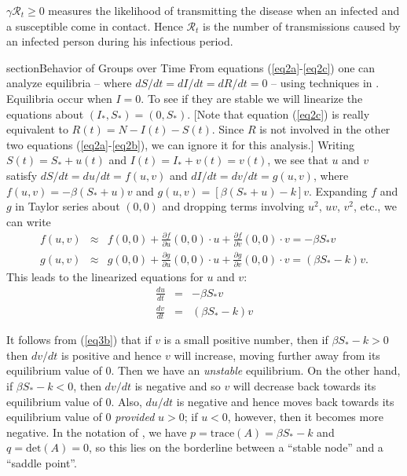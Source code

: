 \documentclass[11pt]{article}
\begin{document}
$\gamma \mathcal{R}_t \geq 0$ measures the likelihood
of transmitting the disease when an infected and a susceptible come
in contact.   Hence $\mathcal{R}_t$ is the number of transmissions
caused by an infected person during his infectious period.

section{Behavior of Groups over Time}
From equations (\ref{eq2a}-\ref{eq2c}) one can analyze equilibria -- where $dS/dt = 
dI/dt = dR/dt = 0$ -- using techniques in \cite[Sec. 9.2]{Tung}.  Equilibria 
occur when $I = 0$.  To see if they are stable we will linearize the
equations about $( I_{*} , S_{*} ) = (0, S_{*} )$.  [Note that equation (\ref{eq2c})
is really equivalent to $R(t) = N - I(t) - S(t)$.  Since $R$ is not involved
in the other two equations (\ref{eq2a}-\ref{eq2b}), we can ignore it for this analysis.]
Writing $S(t) = S_{*} + u(t)$ and $I(t) = I_{*} + v(t) = v(t)$, we see that $u$ and $v$
satisfy $dS/dt = du/dt = f(u,v)$ and $dI/dt = dv/dt = g(u,v)$,
where $f(u,v) = - \beta ( S_{*} + u ) v$ and 
$g(u,v) = [ \beta ( S_{*} + u ) - k] v$.  Expanding $f$ and $g$ in Taylor
series about $(0,0)$ and dropping terms involving $u^2$, $uv$, $v^2$, etc.,
we can write
\begin{eqnarray*}
f(u,v) & \approx & f(0,0) + \frac{\partial f}{\partial u} (0,0) \cdot u +
\frac{\partial f}{\partial v} (0,0) \cdot v = - \beta S_{*} v \\
g(u,v) & \approx & g(0,0) + \frac{\partial g}{\partial u} (0,0) \cdot u +
\frac{\partial g}{\partial v} (0,0) \cdot v = ( \beta S_{*} - k ) v .
\end{eqnarray*}
This leads to the linearized equations for $u$ and $v$:
\begin{eqnarray}
\frac{du}{dt} & = & - \beta S_{*} v \label{eq3a} \\
\frac{dv}{dt} & = & ( \beta S_{*} - k ) v \label{eq3b} 
\end{eqnarray}

It follows from (\ref{eq3b}) that if $v$ is a small positive number, then
if $\beta S_{*} - k > 0$ then $dv/dt$ is positive and hence $v$ will increase,
moving further away from its equilibrium value of $0$.  Then we have an
{\em unstable} equilibrium.  On the other hand, if $\beta S_{*} - k < 0$,
then $dv/dt$ is negative and so $v$ will decrease back towards its 
equilibrium value of $0$.  Also, $du/dt$ is negative and hence moves
back towards its equilibrium value of $0$ {\em provided} $u > 0$; if $u < 0$,
however, then it becomes more negative.  In the notation of \cite[pp. 164-165]{Tung},
we have $p = \mbox{trace}(A) = \beta S_{*} - k$ and $q = \mbox{det} (A) = 0$,
so this lies on the borderline between a ``stable node'' and a ``saddle point''.
\end{document}
